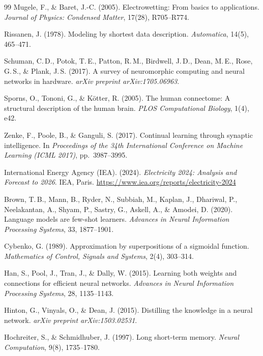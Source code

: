 \documentclass[12pt, a4paper, openany]{report}
\begin{document}
\begin{thebibliography}{99}
Mugele, F., \& Baret, J.-C. (2005).
Electrowetting: From basics to applications.
\textit{Journal of Physics: Condensed Matter}, 17(28), R705--R774.

Rissanen, J. (1978).
Modeling by shortest data description.
\textit{Automatica}, 14(5), 465--471.

Schuman, C.\,D., Potok, T.\,E., Patton, R.\,M., Birdwell, J.\,D., Dean,
M.\,E., Rose, G.\,S., \& Plank, J.\,S. (2017).
A survey of neuromorphic computing and neural networks in hardware.
\textit{arXiv preprint arXiv:1705.06963}.

Sporns, O., Tononi, G., \& K\"{o}tter, R. (2005).
The human connectome: A structural description of the human brain.
\textit{PLOS Computational Biology}, 1(4), e42.

Zenke, F., Poole, B., \& Ganguli, S. (2017).
Continual learning through synaptic intelligence.
In \textit{Proceedings of the 34th International Conference on Machine
Learning (ICML 2017)}, pp.~3987--3995.


International Energy Agency (IEA). (2024).
\textit{Electricity 2024: Analysis and Forecast to 2026}.
IEA, Paris.  \url{https://www.iea.org/reports/electricity-2024}


Brown, T.\,B., Mann, B., Ryder, N., Subbiah, M., Kaplan, J., Dhariwal, P.,
Neelakantan, A., Shyam, P., Sastry, G., Askell, A., \& Amodei, D. (2020).
Language models are few-shot learners.
\textit{Advances in Neural Information Processing Systems}, 33, 1877--1901.

Cybenko, G. (1989).
Approximation by superpositions of a sigmoidal function.
\textit{Mathematics of Control, Signals and Systems}, 2(4), 303--314.

Han, S., Pool, J., Tran, J., \& Dally, W. (2015).
Learning both weights and connections for efficient neural networks.
\textit{Advances in Neural Information Processing Systems}, 28, 1135--1143.

Hinton, G., Vinyals, O., \& Dean, J. (2015).
Distilling the knowledge in a neural network.
\textit{arXiv preprint arXiv:1503.02531}.

Hochreiter, S., \& Schmidhuber, J. (1997).
Long short-term memory.
\textit{Neural Computation}, 9(8), 1735--1780.


\end{thebibliography}
\end{document}
